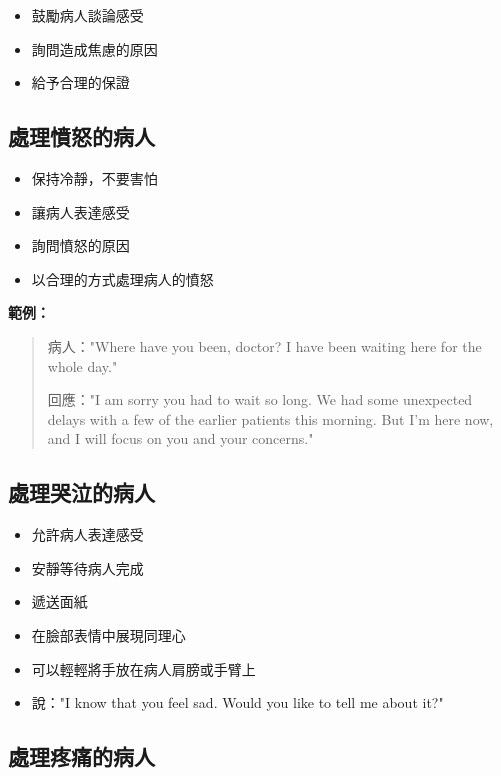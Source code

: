 \documentclass[12pt,a4paper]{article}
\begin{document}
\begin{itemize}
    \item 鼓勵病人談論感受
    \item 詢問造成焦慮的原因
    \item 給予合理的保證
\end{itemize}

\subsection{處理憤怒的病人}

\begin{itemize}
    \item 保持冷靜，不要害怕
    \item 讓病人表達感受
    \item 詢問憤怒的原因
    \item 以合理的方式處理病人的憤怒
\end{itemize}

\textbf{範例：}
\begin{quote}
病人："Where have you been, doctor? I have been waiting here for the whole day."

回應："I am sorry you had to wait so long. We had some unexpected delays with a few of the earlier patients this morning. But I'm here now, and I will focus on you and your concerns."
\end{quote}

\subsection{處理哭泣的病人}

\begin{itemize}
    \item 允許病人表達感受
    \item 安靜等待病人完成
    \item 遞送面紙
    \item 在臉部表情中展現同理心
    \item 可以輕輕將手放在病人肩膀或手臂上
    \item 說："I know that you feel sad. Would you like to tell me about it?"
\end{itemize}

\subsection{處理疼痛的病人}
\end{document}
